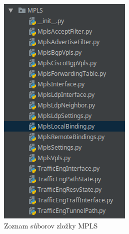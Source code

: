 \begin{figure}[H]
\centering
\includegraphics[scale=0.6]{../text/mplslist.png}
\caption{Zoznam súborov zložky MPLS}
\label{fig:mplslist}
\end{figure}
